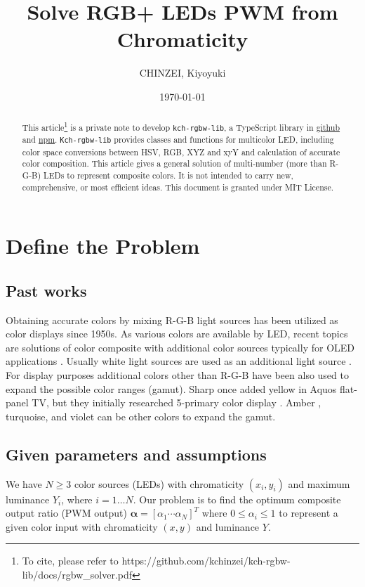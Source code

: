 \documentclass[dvipdfmx,uplatex,a4paper]{article}
\title{Solve RGB+ LEDs PWM from Chromaticity}
\author{CHINZEI, Kiyoyuki}
\date{\today}
\begin{document}
\maketitle

\begin{abstract}
This article\footnote{To cite, please refer to https://github.com/kchinzei/kch-rgbw-lib/docs/rgbw\_solver.pdf} is a private note to develop \texttt{kch-rgbw-lib}, a TypeScript library in \href{https://github.com/kchinzei/kch-rgbw-lib}{github} and \href{https://www.npmjs.com/package/kch-rgbw-lib}{npm}. \texttt{Kch-rgbw-lib} provides classes and functions for multicolor LED, including color space conversions between HSV, RGB, XYZ and xyY and calculation of accurate color composition. This article gives a general solution of multi-number (more than R-G-B) LEDs to represent composite colors. It is not intended to carry new, comprehensive, or most efficient ideas. This document is granted under MIT License.
\end{abstract}

\section{Define the Problem}
\subsection{Past works}\label{s_intro}
Obtaining accurate colors by mixing R-G-B light sources has been utilized as color displays since 1950s. As various colors are available by LED, recent topics are solutions of color composite with additional color sources typically for OLED applications \cite{Chi2011, Lee2014}. Usually white light sources are used as an additional light source \cite{AN1562, Chi2011, Lee2014}. For display purposes additional colors other than R-G-B have been also used to expand the possible color ranges (gamut)\cite{Wikipedia_multicolor}. Sharp once added yellow in Aquos flat-panel TV, but they initially researched 5-primary color display \cite{Sharp2011}. Amber \cite{AN2026}, turquoise, and violet can be other colors to expand the gamut.

\subsection{Given parameters and assumptions}\label{s_assumptions}
We have $N \geq 3$ color sources (LEDs) with chromaticity $(x_i, y_i)$ and maximum luminance $Y_i$, where $i=1 \ldots N$. Our problem is to find the optimum composite output ratio (PWM output) $\boldsymbol{\alpha} = [\alpha_1 \cdots \alpha_N]^T$ where $0 \leq \alpha_i \leq 1$ to represent a given color input with chromaticity $(x, y)$ and luminance $Y$.
\end{document}
